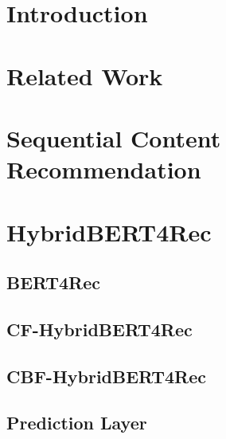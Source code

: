 \documentclass{Academic}
\begin{document}
    \myabstract{}
    \renewcommand{\myTitle}{Hybrid Recommender Models in E-Learning: A Comprehensive Review of HybridBERT4Rec}
    \renewcommand{\MyAuthor}{Leon Knorr}
    \renewcommand{\MyDepartment}{Mannheim Master of Datascience}
    \renewcommand{\ID}{1902854}
    \renewcommand{\Keywords}{Education, AI}
    \maketitle

    \section{Introduction}

    \section{Related Work}

    \section{Sequential Content Recommendation}

    \section{HybridBERT4Rec}

        \subsection{BERT4Rec}

        \subsection{CF-HybridBERT4Rec}

        \subsection{CBF-HybridBERT4Rec}

        \subsection{Prediction Layer}
\end{document}
